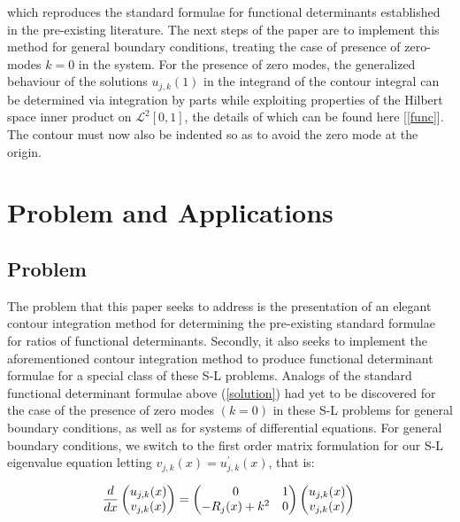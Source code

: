 \documentclass[12]{article}
\begin{document}
which reproduces the standard formulae for functional determinants established in the pre-existing literature. The next steps of the paper are to implement this method for general boundary conditions, treating the case of presence of zero-modes \(k = 0\) in the system. For the presence of zero modes, the generalized behaviour of the solutions \(u_{j,k}(1)\) in the integrand of the contour integral can be determined via integration by parts while exploiting properties of the Hilbert space inner product on \(\mathcal{L}^{2}[0,1]\), the details of which can be found here [\ref{func}]. The contour must now also be indented so as to avoid the zero mode at the origin. 

\section{Problem and Applications}

\subsection{Problem}

The problem that this paper seeks to address is the presentation of an elegant contour integration method for determining the pre-existing standard formulae for ratios of functional determinants. Secondly, it also seeks to implement the aforementioned contour integration method to produce functional determinant formulae for a special class of these S-L problems. Analogs of the standard functional determinant formulae above (\ref{solution}) had yet to be discovered for the case of the presence of zero modes \((k = 0)\) in these S-L problems for general boundary conditions, as well as for systems of differential equations. For general boundary conditions, we switch to the first order matrix formulation for our S-L eigenvalue equation letting \(v_{j,k}(x) = u^{'}_{j,k}(x)\), that is:


\begin{equation} \label{genDE}
\frac{d}{dx} \begin{pmatrix} u_{j,k}(x) \\ v_{j,k}(x) \end{pmatrix} = \begin{pmatrix} 0 & 1\\- R_{j}(x) + k^2 & 0 \end{pmatrix} \begin{pmatrix} u_{j,k}(x) \\ v_{j,k}(x) \end{pmatrix}\\ \end{equation}
\end{document}
